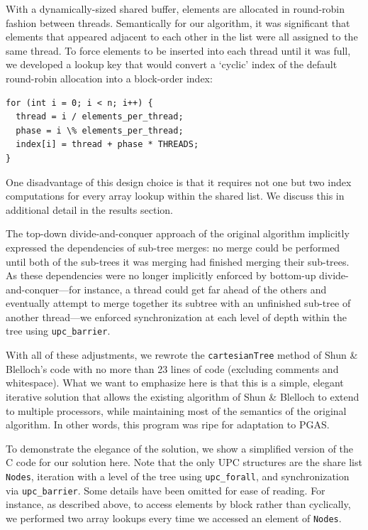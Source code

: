 \documentclass[10pt]{article}
\begin{document}
With a dynamically-sized shared buffer, elements are allocated in round-robin fashion between threads.
Semantically for our algorithm, it was significant that elements that appeared adjacent to each
other in the list were all assigned to the same thread.
To force elements to be inserted into each thread until it was full, we developed a lookup key that
would convert a `cyclic' index of the default round-robin allocation into a block-order index:

\begin{minipage}{\linewidth}
\begin{lstlisting}
for (int i = 0; i < n; i++) {
  thread = i / elements_per_thread;
  phase = i \% elements_per_thread;
  index[i] = thread + phase * THREADS;
}
\end{lstlisting}
\end{minipage}

One disadvantage of this design choice is that it requires not one but two index computations
for every array lookup within the shared list.
We discuss this in additional detail in the results section.

The top-down divide-and-conquer approach of the original algorithm implicitly expressed the
dependencies of sub-tree merges:
no merge could be performed until both of the sub-trees it was merging had finished merging
their sub-trees.
As these dependencies were no longer implicitly enforced by bottom-up divide-and-conquer---for
instance, a thread could get far ahead of the others and eventually attempt to merge together its
subtree with an unfinished sub-tree of another thread---we enforced synchronization at each
level of depth within the tree using \texttt{upc\_barrier}.

With all of these adjustments, we rewrote the \texttt{cartesianTree} method of Shun \& Blelloch's
code with no more than 23 lines of code (excluding comments and whitespace).
What we want to emphasize here is that this is a simple, elegant iterative solution that allows
the existing algorithm of Shun \& Blelloch to extend to multiple processors, while maintaining
most of the semantics of the original algorithm.
In other words, this program was ripe for adaptation to PGAS.

To demonstrate the elegance of the solution, we show a simplified version of the C code for
our solution here.
Note that the only UPC structures are the share list \texttt{Nodes}, iteration with a level
of the tree using \texttt{upc\_forall}, and synchronization via \texttt{upc\_barrier}.
Some details have been omitted for ease of reading.
For instance, as described above, to access elements by block rather than cyclically, we performed
two array lookups every time we accessed an element of \texttt{Nodes}.
\end{document}
